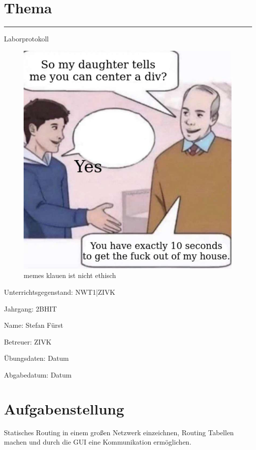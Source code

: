 \documentclass[a4paper]{article}
\begin{document}
\pagestyle{oida}
\section*{Thema}
\par\noindent\rule{\textwidth}{0.4pt}

Laborprotokoll

\begin{figure}[h]
	\includegraphics[scale=0.6]{meme.jpeg}
	\caption{memes klauen ist nicht ethisch}
\end{figure}

\vspace*{\fill}
Unterrichtsgegenstand:	NWT1|ZIVK

Jahrgang:	2BHIT

Name:	Stefan Fürst

Betreuer: 	ZIVK

Übungsdaten:	Datum

Abgabedatum:	Datum


\newpage
\tableofcontents

\newpage

\section{Aufgabenstellung}
Statisches Routing in einem großen Netzwerk einzeichnen, Routing Tabellen machen und durch die GUI eine Kommunikation ermöglichen.
\end{document}
